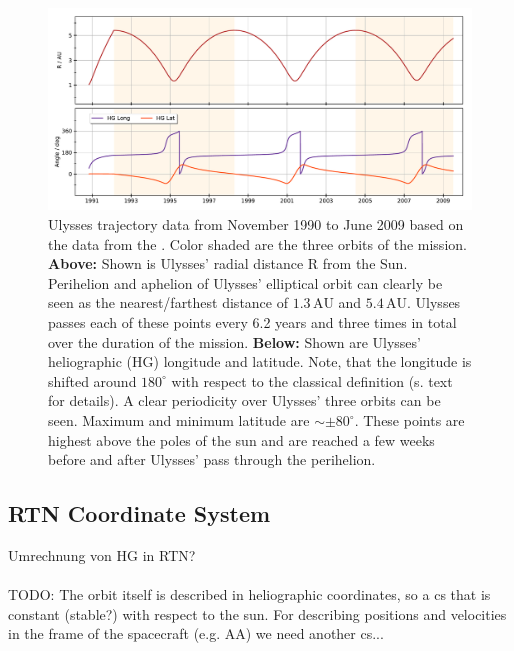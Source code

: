 \begin{figure}[h]
	\includegraphics[width=1\textwidth]{Figures/HG_coord.pdf}
	\centering
	\caption{Ulysses trajectory data from November 1990 to June 2009 based on the data from the \citet{ulysses-data-archive}. Color shaded are the three orbits of the mission. \textbf{Above:} Shown is Ulysses' radial distance R from the Sun. Perihelion and aphelion of Ulysses' elliptical orbit can clearly be seen as the nearest/farthest distance of $1.3\,\mathrm{AU}$ and $5.4\,\mathrm{AU}$. Ulysses passes each of these points every 6.2 years and three times in total over the duration of the mission. \textbf{Below:} Shown are Ulysses' heliographic (HG) longitude and latitude. Note, that the longitude is shifted around $180^\circ$ with respect to the classical definition (s. text for details). A clear periodicity over Ulysses' three orbits can be seen. Maximum and minimum latitude are $\sim \pm 80^\circ$. These points are highest above the poles of the sun and are reached a few weeks before and after Ulysses' pass through the perihelion.}
	\label{fig:traj}
\end{figure}

\subsection{RTN Coordinate System}
Umrechnung von HG in RTN?
\\ \\
TODO:
The orbit itself is described in heliographic coordinates, so a cs that is constant (stable?) with respect to the sun. For describing positions and velocities in the frame of the spacecraft (e.g. AA) we need another cs...

